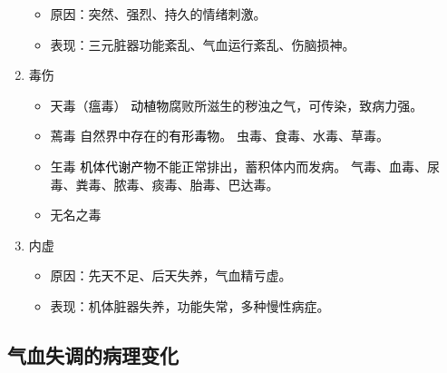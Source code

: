 \documentclass[cn,hazy,black,12pt,normal,founder]{elegantnote}
\newcommand{\redt}[1]{\textcolor{black}{{}#1}}      %
\begin{document}
\begin{enumerate}
  \begin{itemize}
    \item 原因：突然、强烈、持久的情绪刺激。
    \item 表现：三元脏器功能紊乱、气血运行紊乱、伤脑损神。
  \end{itemize}

  \item 毒伤

  \begin{itemize}
    \item 天毒（瘟毒）
    \subitem \redt{动植物}腐败所滋生的秽浊之气，可传染，致病力强。
    \item 蔫毒
    \subitem 自然界中存在的\redt{有形毒物}。
    \subitem 虫毒、食毒、水毒、草毒。
    \item 玍毒
    \subitem \redt{机体代谢产物}不能正常排出，蓄积体内而发病。
    \subitem 气毒、血毒、尿毒、粪毒、脓毒、痰毒、胎毒、巴达毒。
    \item 无名之毒
  \end{itemize}

  \item 内虚

  \begin{itemize}
    \item 原因：先天不足、后天失养，气血精亏虚。
    \item 表现：机体脏器失养，功能失常，多种慢性病症。
  \end{itemize}
\end{enumerate}

\subsection{气血失调的病理变化}
\end{document}
